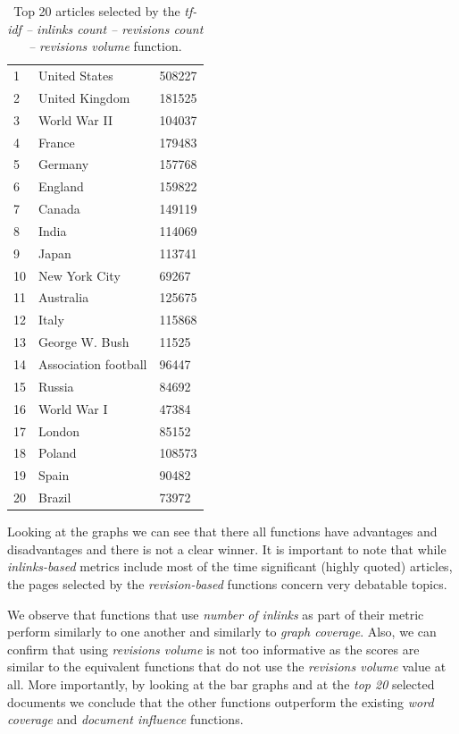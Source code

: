 \begin{table}
    \centering
    \caption {Top 20 articles selected by the \emph{tf-idf -- inlinks count --
    revisions count -- revisions volume} function.}
    \label{tab:inl-rc-rv}
    \begin{tabular}{lll}
    1  & United States        & 508227 \\
    2  & United Kingdom       & 181525 \\
    3  & World War II         & 104037 \\
    4  & France               & 179483 \\
    5  & Germany              & 157768 \\
    6  & England              & 159822 \\
    7  & Canada               & 149119 \\
    8  & India                & 114069 \\
    9  & Japan                & 113741 \\
    10 & New York City        & 69267  \\
    11 & Australia            & 125675 \\
    12 & Italy                & 115868 \\
    13 & George W. Bush       & 11525  \\
    14 & Association football & 96447  \\
    15 & Russia               & 84692  \\
    16 & World War I          & 47384  \\
    17 & London               & 85152  \\
    18 & Poland               & 108573 \\
    19 & Spain                & 90482  \\
    20 & Brazil               & 73972  \\
    \end{tabular}
\end{table}

Looking at the graphs we can see that there all functions have advantages and
disadvantages and there is not a clear winner.
It is important to note that while \emph{inlinks-based} metrics include most of
the time significant (highly quoted) articles, the pages selected by the
\emph{revision-based} functions concern very debatable topics.

We observe that functions that use \emph{number of inlinks} as part of their
metric perform similarly to one another and similarly to \emph{graph coverage}.
Also, we can confirm that using \emph{revisions volume} is not too informative
as the scores are similar to the equivalent functions that do not use the
\emph{revisions volume} value at all.
More importantly, by looking at the bar graphs and at the \emph{top 20}
selected documents we conclude that the other functions outperform the existing
\emph{word coverage} and \emph{document influence} functions.


